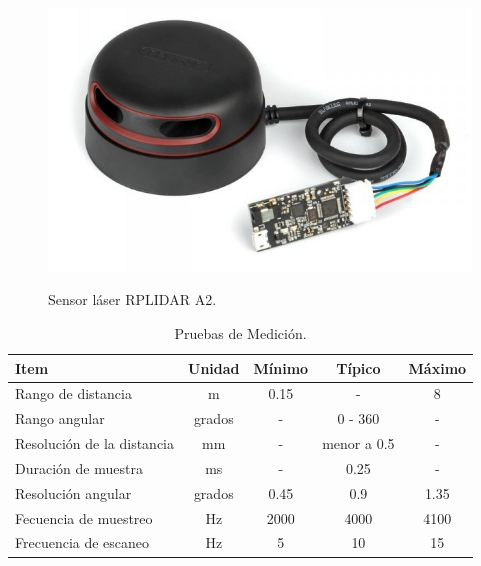 \begin{figure}%
\centering \footnotesize
 {\includegraphics[width=0.60\linewidth]{images/rplidar.JPG}}
 \captionsetup{font=footnotesize}
 \caption{Sensor láser RPLIDAR A2.}
 \label{f:lidar}
\end{figure}

\begin{table}[htbp]
\begin{center}
\begin{tabular}{|l|c|c|c|c|}
\hline
Item & Unidad & M\'inimo & T\'ipico & M\'aximo\\
\hline \hline
Rango de distancia & m & 0.15 & - & 8 \\ \hline
Rango angular & grados & - & 0 - 360 & - \\ \hline
Resoluci\'on de la distancia & mm & - & menor a 0.5 & - \\ \hline
Duraci\'on de muestra & ms & - & 0.25 & - \\ \hline
Resoluci\'on angular & grados & 0.45 & 0.9 & 1.35 \\ \hline
Fecuencia de muestreo & Hz & 2000 & 4000 & 4100 \\ \hline
Frecuencia de escaneo & Hz & 5 & 10 & 15 \\ \hline
\end{tabular}
\caption{Pruebas de Medici\'on.}
\label{tbl:medicion}
\end{center}
\end{table}

